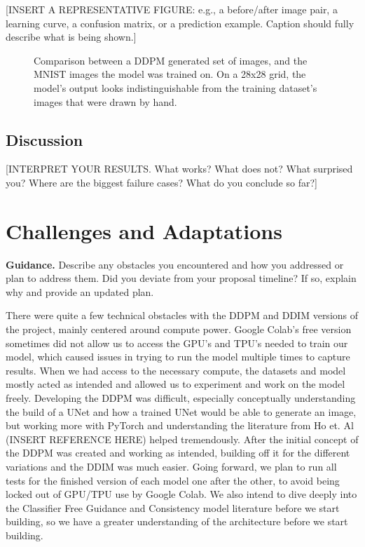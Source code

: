 \documentclass[11pt, letterpaper]{article}
\begin{document}
[INSERT A REPRESENTATIVE FIGURE: e.g., a before/after image pair, a learning
curve, a confusion matrix, or a prediction example. Caption should fully
describe what is being shown.]

\begin{figure}[h]
  \centering
  \caption{Comparison between a DDPM generated set of images, and the MNIST images the model was trained on. On a 28x28 grid, the model's output looks indistinguishable from the training dataset's images that were drawn by hand.}
  \label{fig:qual}
\end{figure}

\subsection{Discussion}

[INTERPRET YOUR RESULTS. What works? What does not? What surprised you?
Where are the biggest failure cases? What do you conclude so far?]

\section{Challenges and Adaptations}

\begin{guidancebox}
\textbf{Guidance.} Describe any obstacles you encountered and how you
addressed or plan to address them. Did you deviate from your proposal timeline?
If so, explain why and provide an updated plan.
\end{guidancebox}

There were quite a few technical obstacles with the DDPM and DDIM versions of the project, mainly centered around compute power. Google Colab's free version sometimes did not allow us to access the GPU's and TPU's needed to train our model, which caused issues in trying to run the model multiple times to capture results. When we had access to the necessary compute, the datasets and model mostly acted as intended and allowed us to experiment and work on the model freely.
Developing the DDPM was difficult, especially conceptually understanding the build of a UNet and how a trained UNet would be able to generate an image, but working more with PyTorch and understanding the literature from Ho et. Al (INSERT REFERENCE HERE) helped tremendously. After the initial concept of the DDPM was created and working as intended, building off it for the different variations and the DDIM was much easier.
Going forward, we plan to run all tests for the finished version of each model one after the other, to avoid being locked out of GPU/TPU use by Google Colab. We also intend to dive deeply into the Classifier Free Guidance and Consistency model literature before we start building, so we have a greater understanding of the architecture before we start building.
\end{document}
